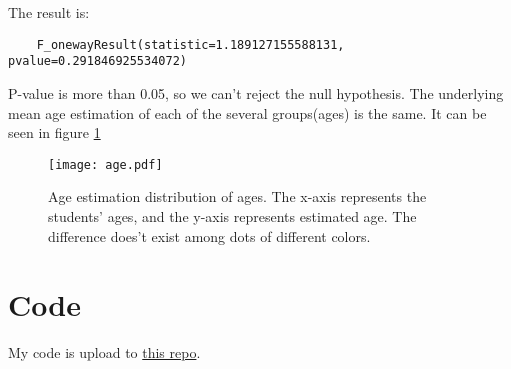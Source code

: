 \documentclass[fancy,11pt,twocol]{elegantbook}
\begin{document}
The result is:
\begin{lstlisting}
	F_onewayResult(statistic=1.189127155588131, pvalue=0.291846925534072)
\end{lstlisting}

P-value is more than 0.05, so we can't reject the null hypothesis. The underlying mean age estimation of each of the several groups(ages) is the same. It can be seen in figure \ref{age}
\begin{figure}[htbp]
	\centering
	\texttt{[image: age.pdf]}
	\caption{Age estimation distribution of ages. 
	The x-axis represents the students' ages, 
	and the y-axis represents estimated age. The difference does't exist among dots of different colors.\label{age}}
\end{figure}




\chapter{Code}
My code is upload to \href{https://en.wikipedia.org/wiki/Pie_chart#Square_chart_/_Waffle_chart}{this repo}.
\end{document}
